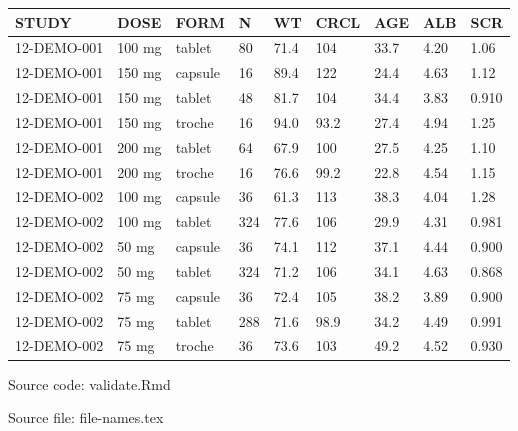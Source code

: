 \setlength{\tabcolsep}{5pt} 
\begin{threeparttable}
\renewcommand{\arraystretch}{1.3}
\begin{tabular}[h]{lllllllll}
\hline
STUDY & DOSE & FORM & N & WT & CRCL & AGE & ALB & SCR \\
\hline
12-DEMO-001 & 100 mg & tablet & 80 & 71.4 & 104 & 33.7 & 4.20 & 1.06 \\
12-DEMO-001 & 150 mg & capsule & 16 & 89.4 & 122 & 24.4 & 4.63 & 1.12 \\
12-DEMO-001 & 150 mg & tablet & 48 & 81.7 & 104 & 34.4 & 3.83 & 0.910 \\
12-DEMO-001 & 150 mg & troche & 16 & 94.0 & 93.2 & 27.4 & 4.94 & 1.25 \\
12-DEMO-001 & 200 mg & tablet & 64 & 67.9 & 100 & 27.5 & 4.25 & 1.10 \\
12-DEMO-001 & 200 mg & troche & 16 & 76.6 & 99.2 & 22.8 & 4.54 & 1.15 \\
12-DEMO-002 & 100 mg & capsule & 36 & 61.3 & 113 & 38.3 & 4.04 & 1.28 \\
12-DEMO-002 & 100 mg & tablet & 324 & 77.6 & 106 & 29.9 & 4.31 & 0.981 \\
12-DEMO-002 & 50 mg & capsule & 36 & 74.1 & 112 & 37.1 & 4.44 & 0.900 \\
12-DEMO-002 & 50 mg & tablet & 324 & 71.2 & 106 & 34.1 & 4.63 & 0.868 \\
12-DEMO-002 & 75 mg & capsule & 36 & 72.4 & 105 & 38.2 & 3.89 & 0.900 \\
12-DEMO-002 & 75 mg & tablet & 288 & 71.6 & 98.9 & 34.2 & 4.49 & 0.991 \\
12-DEMO-002 & 75 mg & troche & 36 & 73.6 & 103 & 49.2 & 4.52 & 0.930 \\
\hline
\end{tabular}
\begin{tablenotes}[flushleft]
\item Source code: validate.Rmd
\item Source file: file-names.tex
\end{tablenotes}
\end{threeparttable}

